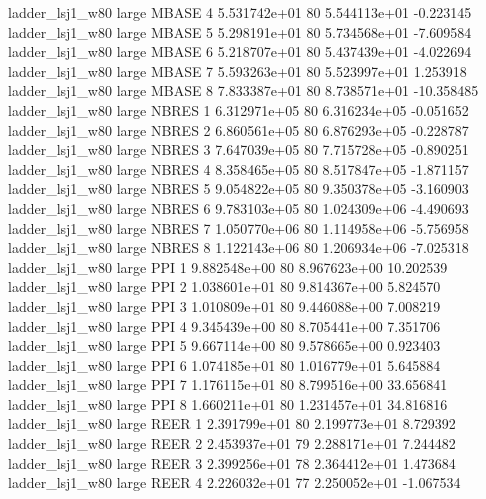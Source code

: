     ladder_lsj1_w80      large    MBASE                 4 5.531742e+01 80   5.544113e+01          -0.223145
    ladder_lsj1_w80      large    MBASE                 5 5.298191e+01 80   5.734568e+01          -7.609584
    ladder_lsj1_w80      large    MBASE                 6 5.218707e+01 80   5.437439e+01          -4.022694
    ladder_lsj1_w80      large    MBASE                 7 5.593263e+01 80   5.523997e+01           1.253918
    ladder_lsj1_w80      large    MBASE                 8 7.833387e+01 80   8.738571e+01         -10.358485
    ladder_lsj1_w80      large    NBRES                 1 6.312971e+05 80   6.316234e+05          -0.051652
    ladder_lsj1_w80      large    NBRES                 2 6.860561e+05 80   6.876293e+05          -0.228787
    ladder_lsj1_w80      large    NBRES                 3 7.647039e+05 80   7.715728e+05          -0.890251
    ladder_lsj1_w80      large    NBRES                 4 8.358465e+05 80   8.517847e+05          -1.871157
    ladder_lsj1_w80      large    NBRES                 5 9.054822e+05 80   9.350378e+05          -3.160903
    ladder_lsj1_w80      large    NBRES                 6 9.783103e+05 80   1.024309e+06          -4.490693
    ladder_lsj1_w80      large    NBRES                 7 1.050770e+06 80   1.114958e+06          -5.756958
    ladder_lsj1_w80      large    NBRES                 8 1.122143e+06 80   1.206934e+06          -7.025318
    ladder_lsj1_w80      large      PPI                 1 9.882548e+00 80   8.967623e+00          10.202539
    ladder_lsj1_w80      large      PPI                 2 1.038601e+01 80   9.814367e+00           5.824570
    ladder_lsj1_w80      large      PPI                 3 1.010809e+01 80   9.446088e+00           7.008219
    ladder_lsj1_w80      large      PPI                 4 9.345439e+00 80   8.705441e+00           7.351706
    ladder_lsj1_w80      large      PPI                 5 9.667114e+00 80   9.578665e+00           0.923403
    ladder_lsj1_w80      large      PPI                 6 1.074185e+01 80   1.016779e+01           5.645884
    ladder_lsj1_w80      large      PPI                 7 1.176115e+01 80   8.799516e+00          33.656841
    ladder_lsj1_w80      large      PPI                 8 1.660211e+01 80   1.231457e+01          34.816816
    ladder_lsj1_w80      large     REER                 1 2.391799e+01 80   2.199773e+01           8.729392
    ladder_lsj1_w80      large     REER                 2 2.453937e+01 79   2.288171e+01           7.244482
    ladder_lsj1_w80      large     REER                 3 2.399256e+01 78   2.364412e+01           1.473684
    ladder_lsj1_w80      large     REER                 4 2.226032e+01 77   2.250052e+01          -1.067534
